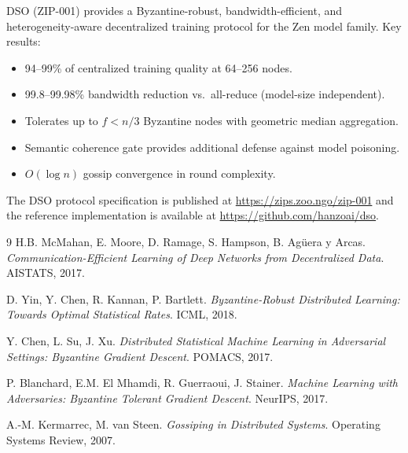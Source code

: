 \documentclass[11pt,a4paper]{article}
\begin{document}
DSO (ZIP-001) provides a Byzantine-robust, bandwidth-efficient, and heterogeneity-aware
decentralized training protocol for the Zen model family. Key results:

\begin{itemize}
    \item 94--99\% of centralized training quality at 64--256 nodes.
    \item 99.8--99.98\% bandwidth reduction vs.\ all-reduce (model-size independent).
    \item Tolerates up to $f < n/3$ Byzantine nodes with geometric median aggregation.
    \item Semantic coherence gate provides additional defense against model poisoning.
    \item $O(\log n)$ gossip convergence in round complexity.
\end{itemize}

The DSO protocol specification is published at \url{https://zips.zoo.ngo/zip-001}
and the reference implementation is available at \url{https://github.com/hanzoai/dso}.

\begin{thebibliography}{9}
H.B. McMahan, E. Moore, D. Ramage, S. Hampson, B. Agüera y Arcas.
\textit{Communication-Efficient Learning of Deep Networks from Decentralized Data}.
AISTATS, 2017.

D. Yin, Y. Chen, R. Kannan, P. Bartlett.
\textit{Byzantine-Robust Distributed Learning: Towards Optimal Statistical Rates}.
ICML, 2018.

Y. Chen, L. Su, J. Xu.
\textit{Distributed Statistical Machine Learning in Adversarial Settings: Byzantine Gradient Descent}.
POMACS, 2017.

P. Blanchard, E.M. El Mhamdi, R. Guerraoui, J. Stainer.
\textit{Machine Learning with Adversaries: Byzantine Tolerant Gradient Descent}.
NeurIPS, 2017.

A.-M. Kermarrec, M. van Steen.
\textit{Gossiping in Distributed Systems}.
Operating Systems Review, 2007.
\end{thebibliography}
\end{document}
